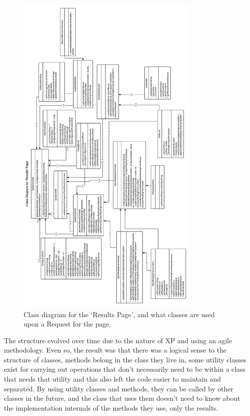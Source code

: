 \begin{figure}[H]
\centering
\includegraphics[width=0.8\textwidth]{images/umlresultspageflip}
\caption{Class diagram for the `Results Page', and what classes are used upon a Request for the page.}
\end{figure}

The structure evolved over time due to the nature of XP and using an agile methodology. Even so, the result was that there was a logical sense to the structure of classes, methods belong in the class they live in, some utility classes exist for carrying out operations that don't necessarily need to be within a class that needs that utility and this also left the code easier to maintain and separated. By using utility classes and methods, they can be called by other classes in the future, and the class that uses them doesn't need to know about the implementation internals of the methods they use, only the results.

